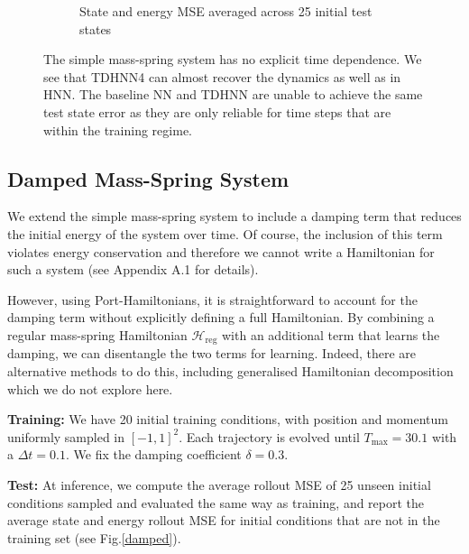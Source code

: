 \documentclass{article}
\begin{document}
\begin{figure}[h!]
\begin{subfigure}[b]{0.48\textwidth}
		\caption{State and energy MSE averaged across 25 initial test states}
	\end{subfigure}
\caption{The simple mass-spring system has no explicit time dependence. We see that TDHNN4 can almost recover the dynamics as well as in HNN. The baseline NN and TDHNN are unable to achieve the same test state error as they are only reliable for time steps that are within the training regime.}
\label{mspring}
\end{figure}


\subsection{Damped Mass-Spring System}

We extend the simple mass-spring system to include a damping term that reduces the initial energy of the system over time. Of course, the inclusion of this term violates energy conservation and therefore we cannot write a Hamiltonian for such a system (see Appendix A.1 for details). 

However, using Port-Hamiltonians, it is straightforward to account for the damping term without explicitly defining a full Hamiltonian. By combining a regular mass-spring Hamiltonian $\mathcal{H}_{\mathrm{reg}}$ with an additional term that learns the damping, we can disentangle the two terms for learning. Indeed, there are alternative methods to do this, including generalised Hamiltonian decomposition which we do not explore here.

\textbf{Training:} We have 20 initial training conditions, with position and momentum uniformly sampled in $[-1,1]^2$. Each trajectory is evolved until $T_{\max} = 30.1$ with a $\Delta t = 0.1$. We fix the damping coefficient $\delta = 0.3$.

\textbf{Test:} At inference, we compute the average rollout MSE of 25 unseen initial conditions sampled and evaluated the same way as training, and report the average state and energy rollout MSE for initial conditions that are not in the training set (see Fig.\ref{damped}).
\end{document}
